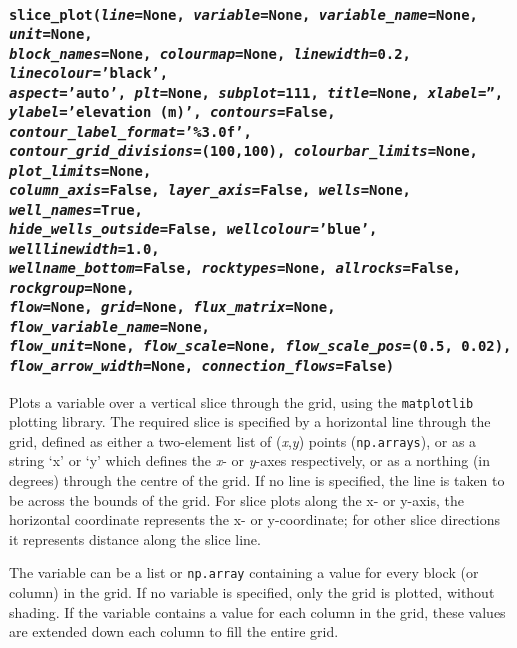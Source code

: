 \begin{snugshade}
\subsubsection{\texttt{slice\_plot(\emph{line}=None, \emph{variable}=None, \emph{variable\_name}=None, \emph{unit}=None,\\
    \emph{block\_names}=None, \emph{colourmap}=None, \emph{linewidth}=0.2, \emph{linecolour}='black',\\
    \emph{aspect}='auto', \emph{plt}=None, \emph{subplot}=111, \emph{title}=None, \emph{xlabel}='',\\
    \emph{ylabel}='elevation (m)', \emph{contours}=False, \emph{contour\_label\_format}='\%3.0f',\\
    \emph{contour\_grid\_divisions}=(100,100), \emph{colourbar\_limits}=None, \emph{plot\_limits}=None,\\
    \emph{column\_axis}=False, \emph{layer\_axis}=False, \emph{wells}=None, \emph{well\_names}=True,\\
    \emph{hide\_wells\_outside}=False, \emph{wellcolour}='blue', \emph{welllinewidth}=1.0,\\
    \emph{wellname\_bottom}=False, \emph{rocktypes}=None, \emph{allrocks}=False, \emph{rockgroup}=None,\\
    \emph{flow}=None, \emph{grid}=None, \emph{flux\_matrix}=None, \emph{flow\_variable\_name}=None,\\
    \emph{flow\_unit}=None, \emph{flow\_scale}=None, \emph{flow\_scale\_pos}=(0.5, 0.02),\\
    \emph{flow\_arrow\_width}=None, \emph{connection\_flows}=False)}}
\end{snugshade}
\label{sec:mulgrid:slice_plot}

Plots a variable over a vertical slice through the grid, using the \texttt{matplotlib} plotting library.  The required slice is specified by a horizontal line through the grid, defined as either a two-element list of (\emph{x},\emph{y}) points (\texttt{np.arrays}), or as a string `x' or `y' which defines the \emph{x}- or \emph{y}-axes respectively, or as a northing (in degrees) through the centre of the grid.  If no line is specified, the line is taken to be across the bounds of the grid.  For slice plots along the x- or y-axis, the horizontal coordinate represents the x- or y-coordinate; for other slice directions it represents distance along the slice line.

The variable can be a list or \texttt{np.array} containing a value for every block (or column) in the grid.  If no variable is specified, only the grid is plotted, without shading.  If the variable contains a value for each column in the grid, these values are extended down each column to fill the entire grid.

